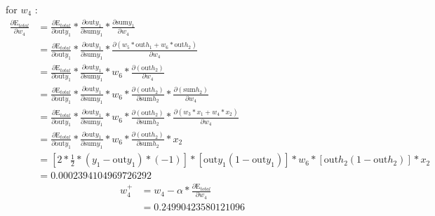 \documentclass[a4paper, article, oneside, USenglish, IN5460]{memoir}
\begin{document}
{\newline
for $w_4$ :
\begin{equation}
\begin{aligned}
\frac{\partial \text{E}_{total}  }{\partial w_4} &= \frac{\partial \text{E}_{total}}{\partial \text{out}y_1} *\frac{\partial  \text{out}y_1}{\partial \text{sum}y_1}*\frac{\partial \text{sum}y_1}{\partial  w_4} \\
&= \frac{\partial \text{E}_{total}}{\partial \text{out}y_1} *\frac{\partial  \text{out}y_1}{\partial \text{sum}y_1}*\frac{\partial ( w_5*\text{out}h_1 + w_6*\text{out}h_2 )} {\partial w_4} \\
&= \frac{\partial \text{E}_{total}}{\partial \text{out}y_1} * \frac{\partial \text{out}y_1}{\partial \text{sum}y_1} *{w_6}* \frac{\partial ( \text{out}h_2 )} {\partial w_4}\\
&= \frac{\partial \text{E}_{total}}{\partial \text{out}y_1} * \frac{\partial \text{out}y_1}{\partial \text{sum}y_1} *{w_6}* \frac{\partial ( \text{out}h_2 )}{\partial \text{sum}h_2} * \frac{\partial ( \text{sum}h_2)}{\partial w_4}\\
&= \frac{\partial \text{E}_{total}}{\partial \text{out}y_1} * \frac{\partial \text{out}y_1}{\partial \text{sum}y_1} *{w_6}* \frac{\partial ( \text{out}h_2 )}{\partial \text{sum}h_2} * \frac{\partial ( w_3*x_1 + w_4*x_2)}{\partial w_4}\\
&= \frac{\partial \text{E}_{total}}{\partial \text{out}y_1} * \frac{\partial \text{out}y_1}{\partial \text{sum}y_1} *{w_6}* \frac{\partial ( \text{out}h_2 )}{\partial \text{sum}h_2} *  {x_2}\\
&= [2*\frac{1}{2}*(y_1 -\text{out}y_1)*(-1)] * [\text{out}y_1(1-\text{out}y_1)] *{w_6}* [\text{out}h_2 (1-\text{out}h_2)]*  {x_2}\\
& = 0.0002394104969726292
 \end{aligned}
\end{equation}
\begin{equation}
\begin{aligned}
w^+_4 &= w_4 - \alpha * \frac{\partial \text{E}_{total}  }{\partial w_4} \\
& = 0.24990423580121096 
\end{aligned}
\end{equation}

}
\end{document}
